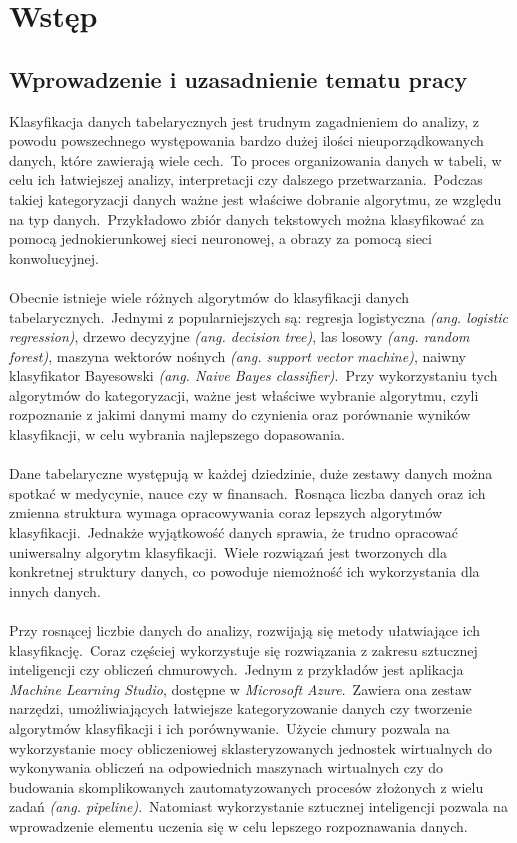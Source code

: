 \chapter{Wstęp}

\section{Wprowadzenie i uzasadnienie tematu pracy}
Klasyfikacja danych tabelarycznych jest trudnym zagadnieniem do analizy, z powodu powszechnego występowania bardzo dużej ilości nieuporządkowanych danych, które zawierają wiele cech.\ To proces organizowania danych w tabeli, w celu ich łatwiejszej analizy, interpretacji czy dalszego przetwarzania.\ Podczas takiej kategoryzacji danych ważne jest właściwe dobranie algorytmu, ze względu na typ danych.\ Przykładowo zbiór danych tekstowych można klasyfikować za pomocą jednokierunkowej sieci neuronowej, a obrazy za pomocą sieci konwolucyjnej.
\\ \\
Obecnie istnieje wiele różnych algorytmów do klasyfikacji danych tabelarycznych.\ Jednymi z popularniejszych są: regresja logistyczna \textit{(ang. logistic regression)}, drzewo decyzyjne \textit{(ang. decision tree)}, las losowy \textit{(ang. random forest)}, maszyna wektorów nośnych \textit{(ang. support vector machine)}, naiwny klasyfikator Bayesowski \textit{(ang. Naive Bayes classifier)}.\ Przy wykorzystaniu tych algorytmów do kategoryzacji, ważne jest właściwe wybranie algorytmu, czyli rozpoznanie z jakimi danymi mamy do czynienia oraz porównanie wyników klasyfikacji, w celu wybrania najlepszego dopasowania.
\\ \\
Dane tabelaryczne występują w każdej dziedzinie, duże zestawy danych można spotkać w medycynie, nauce czy w finansach.\ Rosnąca liczba danych oraz ich zmienna struktura wymaga opracowywania coraz lepszych algorytmów klasyfikacji.\ Jednakże wyjątkowość danych sprawia, że trudno opracować uniwersalny algorytm klasyfikacji.\ Wiele rozwiązań jest tworzonych dla konkretnej struktury danych, co powoduje niemożność ich wykorzystania dla innych danych.
\\ \\
Przy rosnącej liczbie danych do analizy, rozwijają się metody ułatwiające ich klasyfikację.\ Coraz częściej wykorzystuje się rozwiązania z zakresu sztucznej inteligencji czy obliczeń chmurowych.\ Jednym z przykładów jest aplikacja \textit{Machine Learning Studio},  dostępne w \textit{Microsoft Azure}.\ Zawiera ona zestaw narzędzi, umożliwiających łatwiejsze kategoryzowanie danych czy tworzenie algorytmów klasyfikacji i ich porównywanie.\ Użycie chmury pozwala na wykorzystanie mocy obliczeniowej sklasteryzowanych jednostek wirtualnych do wykonywania obliczeń na odpowiednich maszynach wirtualnych czy do budowania skomplikowanych zautomatyzowanych procesów złożonych z wielu zadań \textit{(ang. pipeline)}.\ Natomiast wykorzystanie sztucznej inteligencji pozwala na wprowadzenie elementu uczenia się w celu lepszego rozpoznawania danych.
